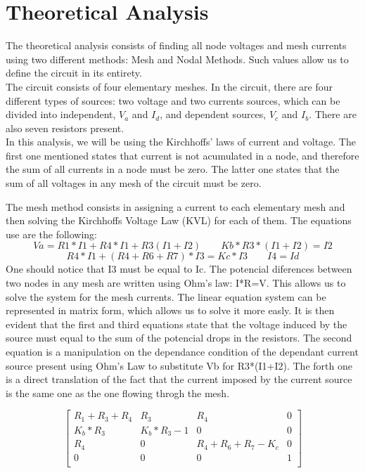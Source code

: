 \section{Theoretical Analysis}
\label{sec:analysis}

The theoretical analysis consists of finding all node voltages and mesh currents using two different methods: Mesh and Nodal Methods. Such values allow us to define the circuit in its entirety.\\

The circuit consists of four elementary meshes. In the circuit, there are four different types of sources: two voltage and two currents sources, which can be divided into independent, $V_a$ and $I_d$, and dependent sources, $V_c$ and $I_b$. There are also seven resistors present.\\
In this analysis, we will be using the Kirchhoffs' laws of current and voltage. The first one mentioned states that current is not acumulated in a node, and therefore the sum of all currents in a node must be zero. The latter one states that the sum of all voltages in any mesh of the circuit must be zero.

\vspace {1cm}
The mesh method consists in assigning a current to each elementary mesh and then solving the Kirchhoffs Voltage Law (KVL) for each of them. The equations use are the following:
\[ Va=R1*I1+R4*I1+R3(I1+I2) \quad \quad  Kb*R3*(I1+I2)=I2\]
 \[R4*I1+(R4+R6+R7)*I3=Kc*I3 \quad \quad I4=Id\]
One should notice that I3 must be equal to Ic. The potencial diferences between two nodes in any mesh are written using Ohm's law: I*R=V. This allows us to solve the system for the mesh currents. The linear equation system can be represented in matrix form, which allows us to solve it more easly. It is then evident that the first and third equations state that the voltage induced by the source must equal to the sum of the potencial drops in the resistors. The second equation is a manipulation on the dependance condition of the dependant current source present using Ohm's Law to substitute Vb for R3*(I1+I2). The forth one is a direct translation of the fact that the current imposed by the current source is the same one as the one flowing throgh the mesh.

$$
\begin{bmatrix} 
R_1+R_3+R_4 & R_3       & R_4             & 0 \\       
K_b*R_3     & K_b*R_3-1 & 0               & 0 \\
R_4         &     0     & R_4+R_6+R_7-K_c & 0 \\
0           & 0         & 0               & 1 \\
\end {bmatrix} 
$$
\quad


